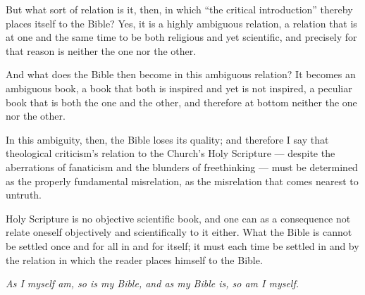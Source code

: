 \documentclass[12pt,a4paper]{book}
\begin{document}
But what sort of relation is it, then, in which ``the critical introduction''
thereby places itself to the Bible? Yes, it is a highly ambiguous relation, a
relation that is at one and the same time to be both religious and yet
scientific, and precisely for that reason is neither the one nor the other.

And what does the Bible then become in this ambiguous relation? It becomes an
ambiguous book, a book that both is inspired and yet is not inspired, a peculiar
book that is both the one and the other, and therefore at bottom neither the one
nor the other.

In this ambiguity, then, the Bible loses its quality; and therefore I say that
theological criticism's relation to the Church's Holy Scripture --- despite the
aberrations of fanaticism and the
blunders of freethinking --- must be determined as the properly fundamental
misrelation, as the misrelation that comes nearest to untruth.

Holy Scripture is no objective scientific book, and one can as a consequence not
relate oneself objectively and scientifically to it either. What the Bible is
cannot be settled once and for all in and for itself; it must each time be
settled in and by the relation in which the reader places himself to the Bible.

\emph{As I myself am, so is my Bible, and as my Bible is, so am I myself.}
\end{document}
